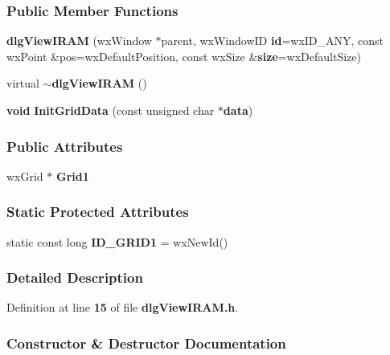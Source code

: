 \subsubsection*{Public Member Functions}
\begin{DoxyCompactItemize}
\item 
{\bf dlg\+View\+I\+R\+AM} (wx\+Window $\ast$parent, wx\+Window\+ID {\bf id}=wx\+I\+D\+\_\+\+A\+NY, const wx\+Point \&pos=wx\+Default\+Position, const wx\+Size \&{\bf size}=wx\+Default\+Size)
\item 
virtual {\bf $\sim$dlg\+View\+I\+R\+AM} ()
\item 
{\bf void} {\bf Init\+Grid\+Data} (const unsigned char $\ast${\bf data})
\end{DoxyCompactItemize}
\subsubsection*{Public Attributes}
\begin{DoxyCompactItemize}
\item 
wx\+Grid $\ast$ {\bf Grid1}
\end{DoxyCompactItemize}
\subsubsection*{Static Protected Attributes}
\begin{DoxyCompactItemize}
\item 
static const long {\bf I\+D\+\_\+\+G\+R\+I\+D1} = wx\+New\+Id()
\end{DoxyCompactItemize}


\subsubsection{Detailed Description}


Definition at line {\bf 15} of file {\bf dlg\+View\+I\+R\+A\+M.\+h}.



\subsubsection{Constructor \& Destructor Documentation}
